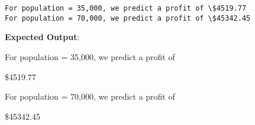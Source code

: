 \documentclass[11pt]{article}
\begin{document}
    \begin{Verbatim}[commandchars=\\\{\}]
For population = 35,000, we predict a profit of \$4519.77
For population = 70,000, we predict a profit of \$45342.45
    \end{Verbatim}

    \textbf{Expected Output}:

For population = 35,000, we predict a profit of

\$4519.77

For population = 70,000, we predict a profit of

\$45342.45


    
    
    
\end{document}
